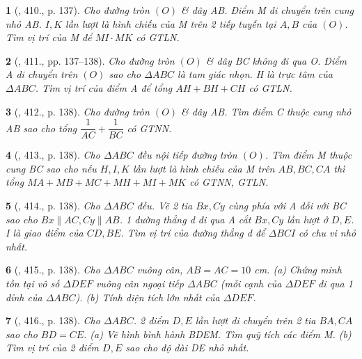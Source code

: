 \documentclass{article}
\newtheorem{baitoan}{}
\begin{document}
\begin{baitoan}[\cite{Binh_Toan_9_tap_2}, 410., p. 137]
	Cho đường tròn $(O)$ \& dây AB. Điểm M di chuyển trên cung nhỏ AB. $I,K$ lần lượt là hình chiếu của M trên 2 tiếp tuyến tại $A,B$ của $(O)$. Tìm vị trí của M để $MI\cdot MK$ có {\rm GTLN}.
\end{baitoan}

\begin{baitoan}[\cite{Binh_Toan_9_tap_2}, 411., pp. 137--138]
	Cho đường tròn $(O)$ \& dây BC không đi qua O. Điểm A di chuyển trên $(O)$ sao cho $\Delta ABC$ là tam giác nhọn. H là trực tâm của $\Delta ABC$. Tìm vị trí của điểm A để tổng $AH + BH + CH$ có {\rm GTLN}.
\end{baitoan}

\begin{baitoan}[\cite{Binh_Toan_9_tap_2}, 412., p. 138]
	Cho đường tròn $(O)$ \& dây AB. Tìm điểm C thuộc cung nhỏ AB sao cho tổng $\dfrac{1}{AC} + \dfrac{1}{BC}$ có {\rm GTNN}.
\end{baitoan}

\begin{baitoan}[\cite{Binh_Toan_9_tap_2}, 413., p. 138]
	Cho $\Delta ABC$ đều nội tiếp đường tròn $(O)$. Tìm điểm M thuộc cung BC sao cho nếu $H,I,K$ lần lượt là hình chiếu của M trên $AB,BC,CA$ thì tổng $MA + MB + MC + MH + MI + MK$ có {\rm GTNN, GTLN}.
\end{baitoan}

\begin{baitoan}[\cite{Binh_Toan_9_tap_2}, 414., p. 138]
	Cho $\Delta ABC$ đều. Vẽ 2 tia $Bx,Cy$ cùng phía với A đối với BC sao cho $Bx\parallel AC,Cy\parallel AB$. 1 đường thẳng d đi qua A cắt $Bx,Cy$ lần lượt ở $D,E$. I là giao điểm của $CD,BE$. Tìm vị trí của đường thẳng d để $\Delta BCI$ có chu vi nhỏ nhất.
\end{baitoan}

\begin{baitoan}[\cite{Binh_Toan_9_tap_2}, 415., p. 138]
	Cho $\Delta ABC$ vuông cân, $AB = AC = 10$ {\rm cm}. (a) Chứng minh tồn tại vô số $\Delta DEF$ vuông cân ngoại tiếp $\Delta ABC$ (mỗi cạnh của $\Delta DEF$ đi qua 1 đỉnh của $\Delta ABC$). (b) Tính diện tích lớn nhất của $\Delta DEF$.
\end{baitoan}

\begin{baitoan}[\cite{Binh_Toan_9_tap_2}, 416., p. 138]
	Cho $\Delta ABC$. 2 điểm $D,E$ lần lượt di chuyển trên 2 tia $BA,CA$ sao cho $BD = CE$. (a) Vẽ hình bình hành BDEM. Tìm quỹ tích các điểm M. (b) Tìm vị trí của 2 điểm $D,E$ sao cho độ dài DE nhỏ nhất.
\end{baitoan}
\end{document}
